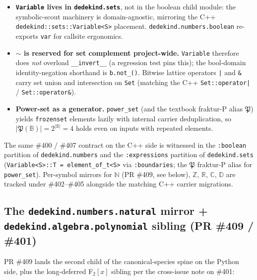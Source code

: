 \documentclass[11pt, a4paper]{report}
\begin{document}
\begin{itemize}
  \item \textbf{\texttt{Variable} lives in \texttt{dedekind.sets}}, not in the boolean child module: the symbolic-scout machinery is domain-agnostic, mirroring the C++ \texttt{dedekind::sets::Variable<S>} placement. \texttt{dedekind.numbers.boolean} re-exports \texttt{var} for callsite ergonomics.
  \item \textbf{\texttt{$\sim$} is reserved for set complement project-wide.} \texttt{Variable} therefore does \emph{not} overload \texttt{\_\_invert\_\_} (a regression test pins this); the bool-domain identity-negation shorthand is \texttt{b.not\_()}. Bitwise lattice operators \texttt{|} and \texttt{\&} carry set union and intersection on \texttt{Set} (matching the C++ \texttt{Set::operator|} / \texttt{Set::operator\&}).
  \item \textbf{Power-set as a generator.} \texttt{power\_set} (and the textbook fraktur-P alias \texttt{$\mathfrak{P}$}) yields \texttt{frozenset} elements lazily with internal carrier deduplication, so $|\mathfrak{P}(\mathbb{B})| = 2^{|\mathbb{B}|} = 4$ holds even on inputs with repeated elements.
\end{itemize}

The same \#400 / \#407 contract on the C++ side is witnessed in the \texttt{:boolean} partition of \texttt{dedekind.numbers} and the \texttt{:expressions} partition of \texttt{dedekind.sets} (\texttt{Variable<S>::T = element\_of\_t<S>} via \texttt{:boundaries}; the \texttt{$\mathfrak{P}$} fraktur-P alias for \texttt{power\_set}). Per-symbol mirrors for $\mathbb{N}$ (PR \#409, see below), $\mathbb{Z}$, $\mathbb{R}$, $\mathbb{C}$, $\mathbb{D}$ are tracked under \#402--\#405 alongside the matching C++ carrier migrations.

\subsection{The \texttt{dedekind.numbers.natural} mirror + \texttt{dedekind.algebra.polynomial} sibling (PR \#409 / \#401)}
\label{sec:python-numbers-natural-mirror}

PR \#409 lands the second child of the canonical-species spine on the Python side, plus the long-deferred F$_2[x]$ sibling per the cross-issue note on \#401:
\end{document}
